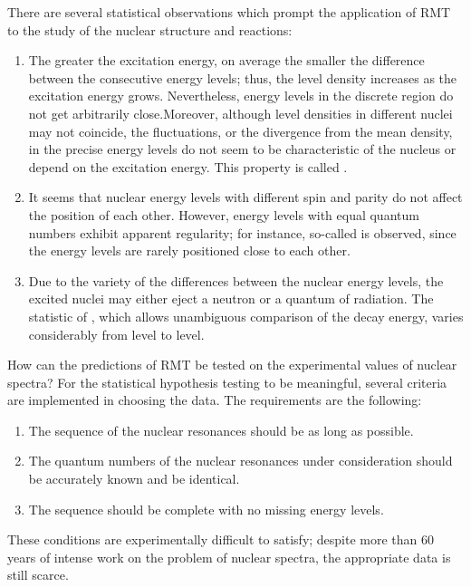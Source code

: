 There are several statistical observations which prompt the application of RMT to the study of the nuclear structure and reactions\cite{mehta}:
\begin{enumerate}
\item The greater the excitation energy, on average the smaller the difference between the consecutive energy levels; thus, the level density increases as the excitation energy grows. Nevertheless, energy levels in the discrete region do not get arbitrarily close.Moreover, although level densities in different nuclei may not coincide, the fluctuations, or the divergence from the mean density, in the precise energy levels do not seem to be characteristic of the nucleus or depend on the excitation energy. This property is called .
\item It seems that nuclear energy levels with different spin and parity do not affect the position of each other. However, energy levels with equal quantum numbers exhibit apparent regularity; for instance, so-called  is observed, since the energy levels are rarely positioned close to each other.
\item Due to the variety of the differences between the nuclear energy levels, the excited nuclei may either eject a neutron or a quantum of radiation. The statistic of , which allows unambiguous comparison of the decay energy, varies considerably from level to level. 
\end{enumerate}

How can the predictions of RMT be tested on the experimental values of nuclear spectra? For the statistical hypothesis testing to be meaningful, several criteria are implemented in choosing the data. The requirements are the following\cite{gom11}: 
\begin{enumerate}
\item The sequence of the nuclear resonances should be as long as possible.
\item The quantum numbers of the nuclear resonances under consideration should be accurately known and be identical.
\item The sequence should be complete with no missing energy levels.
\end{enumerate}
These conditions are experimentally difficult to satisfy; despite more than 60 years of intense work on the problem of nuclear spectra, the appropriate data is still scarce.\cite{wei14}

